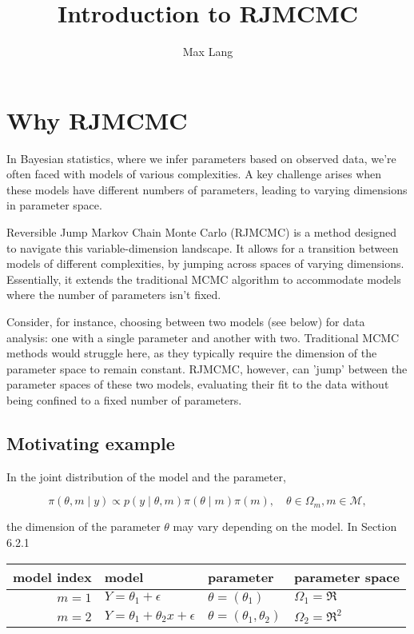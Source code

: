 \documentclass[10pt]{article}
\title{Introduction to RJMCMC}
\author{Max Lang}
\date{}
\begin{document}
\maketitle

\section*{Why RJMCMC}
In Bayesian statistics, where we infer parameters based on observed data, we're often faced with models of various complexities. A key challenge arises when these models have different numbers of parameters, leading to varying dimensions in parameter space.

Reversible Jump Markov Chain Monte Carlo (RJMCMC) is a method designed to navigate this variable-dimension landscape. It allows for a  transition between models of different complexities, by jumping across spaces of varying dimensions. Essentially, it extends the traditional MCMC algorithm to accommodate models where the number of parameters isn't fixed.

Consider, for instance, choosing between two models (see below) for data analysis: one with a single parameter and another with two. Traditional MCMC methods would struggle here, as they typically require the dimension of the parameter space to remain constant. RJMCMC, however, can 'jump' between the parameter spaces of these two models, evaluating their fit to the data without being confined to a fixed number of parameters.

\subsection*{Motivating example}
In the joint distribution of the model and the parameter,

$$
\pi(\theta, m \mid y) \propto p(y \mid \theta, m) \pi(\theta \mid m) \pi(m), \quad \theta \in \Omega_m, m \in \mathcal{M},
$$

the dimension of the parameter $\theta$ may vary depending on the model. In Section 6.2.1

\begin{center}
\begin{tabular}{r|l|l|l}
model index & model & parameter & parameter space \\
\hline
$m=1$ & $Y=\theta_1+\epsilon$ & $\theta=\left(\theta_1\right)$ & $\Omega_1=\Re$ \\
$m=2$ & $Y=\theta_1+\theta_2 x+\epsilon$ & $\theta=\left(\theta_1, \theta_2\right)$ & $\Omega_2=\Re^2$ \\
\end{tabular}
\end{center}
\end{document}
